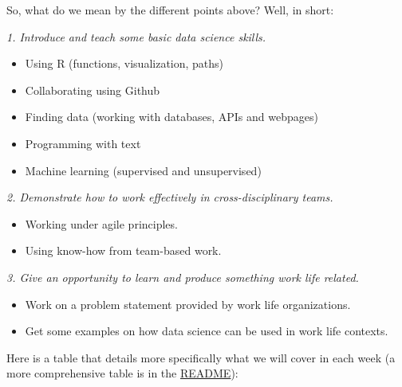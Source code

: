 \documentclass[
]{article}
\providecommand{\tightlist}{%
  \setlength{\itemsep}{0pt}\setlength{\parskip}{0pt}}
\begin{document}
So, what do we mean by the different points above? Well, in short:

\emph{1. Introduce and teach some basic data science skills.}

\begin{itemize}
\tightlist
\item
  Using R (functions, visualization, paths)
\item
  Collaborating using Github
\item
  Finding data (working with databases, APIs and webpages)
\item
  Programming with text
\item
  Machine learning (supervised and unsupervised)
\end{itemize}

\emph{2. Demonstrate how to work effectively in cross-disciplinary
teams.}

\begin{itemize}
\tightlist
\item
  Working under agile principles.
\item
  Using know-how from team-based work.
\end{itemize}

\emph{3. Give an opportunity to learn and produce something work life
related.}

\begin{itemize}
\tightlist
\item
  Work on a problem statement provided by work life organizations.
\item
  Get some examples on how data science can be used in work life
  contexts.
\end{itemize}

Here is a table that details more specifically what we will cover in
each week (a more comprehensive table is in the
\href{https://github.com/sbjorkholt/ISSSV1337}{README}):
\end{document}
